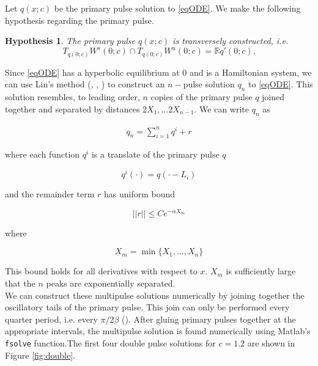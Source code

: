 \documentclass[12pt]{article}
\def\R{{\mathbb R}}
\newtheorem{hypothesis}{Hypothesis}
\begin{document}
Let $q(x; c)$ be the primary pulse solution to \eqref{eqODE}. We make the following hypothesis regarding the primary pulse.

\begin{hypothesis}\label{transverseq}
The primary pulse $q(x; c)$ is transversely constructed, i.e. 
\[
T_{q(0; c)} W^s(0; c) \cap T_{q(0; c)} W^u(0; c) = \R q'(0; c).
\]
\end{hypothesis}

Since \eqref{eqODE} has a hyperbolic equilibrium at 0 and is a Hamiltonian system, we can use Lin's method (\cite{Sanstede1993}, \cite{Sandstede1997}, \cite{Sandstede1998}) to construct an $n-$pulse solution $q_n$ to \eqref{eqODE}. This solution resembles, to leading order, $n$ copies of the primary pulse $q$ joined together and separated by distances $2 X_1, \dots 2 X_{n-1}$. We can write $q_n$ as 

\begin{align}\label{qn}
q_n = \sum_{i = 1}^{n} q^i + r
\end{align}

where each function $q^i$ is a translate of the primary pulse $q$

\begin{equation}\label{qi}
q^i(\cdot) = q(\cdot - L_i)
\end{equation}

and the remainder term $r$ has uniform bound

\begin{equation}
||r|| \leq C e^{-\alpha X_m}
\end{equation}

where

\begin{equation}\label{defXm}
X_m = \min\{X_1, \dots, X_n \}
\end{equation}

This bound holds for all derivatives with respect to $x$. $X_m$ is sufficiently large that the $n$ peaks are exponentially separated.\\

We can construct these multipulse solutions numerically by joining together the oscillatory tails of the primary pulse. This join can only be performed every quarter period, i.e. every $\pi / 2 \beta$ (\cite{Sandstede1997}). After gluing primary pulses together at the appropriate intervals, the multipulse solution is found numerically using Matlab's \texttt{fsolve} function.The first four double pulse solutions for $c = 1.2$ are shown in Figure \ref{fig:double}.
\end{document}
